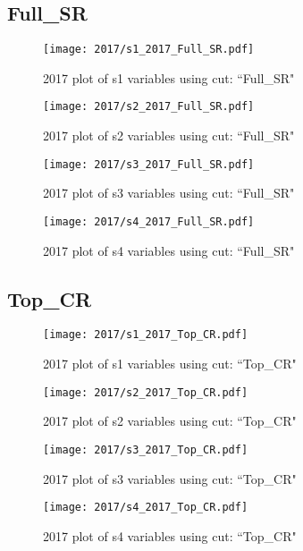 \documentclass{article}
\begin{document}
      \subsection*{Full\_SR}
                        \begin{figure}[H]
                            \centering
                            \caption{2017 plot of s1 variables using cut: ``Full\_SR"}
                            \texttt{[image: 2017/s1\_2017\_Full\_SR.pdf]}
                        \end{figure}    
                        \begin{figure}[H]
                            \centering
                            \caption{2017 plot of s2 variables using cut: ``Full\_SR"}
                            \texttt{[image: 2017/s2\_2017\_Full\_SR.pdf]}
                        \end{figure}    
                        \begin{figure}[H]
                            \centering
                            \caption{2017 plot of s3 variables using cut: ``Full\_SR"}
                            \texttt{[image: 2017/s3\_2017\_Full\_SR.pdf]}
                        \end{figure}    
                        \begin{figure}[H]
                            \centering
                            \caption{2017 plot of s4 variables using cut: ``Full\_SR"}
                            \texttt{[image: 2017/s4\_2017\_Full\_SR.pdf]}
                        \end{figure}    
      \subsection*{Top\_CR}
                        \begin{figure}[H]
                            \centering
                            \caption{2017 plot of s1 variables using cut: ``Top\_CR"}
                            \texttt{[image: 2017/s1\_2017\_Top\_CR.pdf]}
                        \end{figure}    
                        \begin{figure}[H]
                            \centering
                            \caption{2017 plot of s2 variables using cut: ``Top\_CR"}
                            \texttt{[image: 2017/s2\_2017\_Top\_CR.pdf]}
                        \end{figure}    
                        \begin{figure}[H]
                            \centering
                            \caption{2017 plot of s3 variables using cut: ``Top\_CR"}
                            \texttt{[image: 2017/s3\_2017\_Top\_CR.pdf]}
                        \end{figure}    
                        \begin{figure}[H]
                            \centering
                            \caption{2017 plot of s4 variables using cut: ``Top\_CR"}
                            \texttt{[image: 2017/s4\_2017\_Top\_CR.pdf]}
                        \end{figure}    
\end{document}
